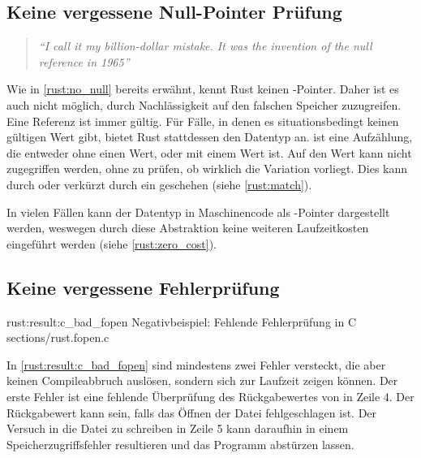 \subsection{Keine vergessene Null-Pointer Prüfung}
\label{rust:guarantee:no_null}

\begin{quotation}
	\textit{\enquote{I call it my billion-dollar mistake. It was the invention of the null reference in 1965}}
	\cite[Tony Hoare, QCon Software Konferenz in London, 2009]{rust:infoq:null}
\end{quotation}

Wie in \autoref{rust:no_null} bereits erwähnt, kennt Rust keinen -Pointer.
Daher ist es auch nicht möglich, durch Nachlässigkeit auf den falschen Speicher zuzugreifen.
Eine Referenz ist immer gültig.
Für Fälle, in denen es situationsbedingt keinen gültigen Wert gibt, bietet Rust stattdessen den  Datentyp an.
 ist eine Aufzählung, die entweder  ohne einen Wert, oder  mit einem Wert ist.
Auf den Wert kann nicht zugegriffen werden, ohne zu prüfen, ob wirklich die Variation  vorliegt.
Dies kann durch  oder verkürzt durch ein  geschehen (siehe \autoref{rust:match}).

In vielen Fällen kann der  Datentyp in Maschinencode als -Pointer dargestellt werden, weswegen durch diese Abstraktion keine weiteren Laufzeitkosten eingeführt werden \cite[100]{rust:orly_programming} (siehe \autoref{rust:zero_cost}).

\subsection{Keine vergessene Fehlerprüfung}
\label{rust:result}

\ccinclude
	{rust:result:c_bad_fopen}
	{Negativbeispiel: Fehlende Fehlerprüfung in C}
	{sections/rust.fopen.c}

In \autoref{rust:result:c_bad_fopen} sind mindestens zwei Fehler versteckt, die aber keinen Compileabbruch auslösen, sondern sich zur Laufzeit zeigen können.
Der erste Fehler ist eine fehlende Überprüfung des Rückgabewertes von  in Zeile 4.
Der Rückgabewert kann  sein, falls das Öffnen der Datei fehlgeschlagen ist.
Der Versuch in die Datei zu schreiben in Zeile 5 kann daraufhin in einem Speicherzugriffsfehler resultieren und das Programm abstürzen lassen.

